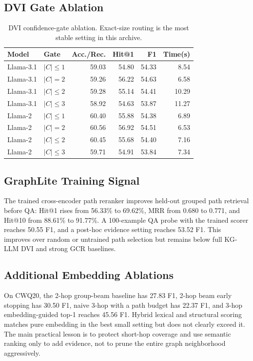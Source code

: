 \documentclass[10pt,twocolumn]{article}
\begin{document}
\subsection{DVI Gate Ablation}
\begin{table}[H]
\centering
\small
\begin{tabular}{llrrrr}
\toprule
Model & Gate & Acc./Rec. & Hit@1 & F1 & Time(s) \\
\midrule
Llama-3.1 & $|C|\le1$ & 59.03 & 54.80 & 54.33 & 8.54 \\
Llama-3.1 & $|C|=2$ & 59.26 & 56.22 & 54.63 & 6.58 \\
Llama-3.1 & $|C|\le2$ & 59.28 & 55.14 & 54.41 & 10.29 \\
Llama-3.1 & $|C|\le3$ & 58.92 & 54.63 & 53.87 & 11.27 \\
\midrule
Llama-2 & $|C|\le1$ & 60.40 & 55.88 & 54.38 & 6.89 \\
Llama-2 & $|C|=2$ & 60.56 & 56.92 & 54.51 & 6.53 \\
Llama-2 & $|C|\le2$ & 60.45 & 55.68 & 54.40 & 7.16 \\
Llama-2 & $|C|\le3$ & 59.71 & 54.91 & 53.84 & 7.34 \\
\bottomrule
\end{tabular}
\caption{DVI confidence-gate ablation. Exact-size routing is the most stable setting in this archive.}
\end{table}

\subsection{GraphLite Training Signal}
The trained cross-encoder path reranker improves held-out grouped path retrieval before QA: Hit@1 rises from 56.33\% to 69.62\%, MRR from 0.680 to 0.771, and Hit@10 from 88.61\% to 91.77\%. A 100-example QA probe with the trained scorer reaches 50.55 F1, and a post-hoc evidence setting reaches 53.52 F1. This improves over random or untrained path selection but remains below full KG-LLM DVI and strong GCR baselines.

\subsection{Additional Embedding Ablations}
On CWQ20, the 2-hop group-beam baseline has 27.83 F1, 2-hop beam early stopping has 30.50 F1, naive 3-hop with a path budget has 22.37 F1, and 3-hop embedding-guided top-1 reaches 45.56 F1. Hybrid lexical and structural scoring matches pure embedding in the best small setting but does not clearly exceed it. The main practical lesson is to protect short-hop coverage and use semantic ranking only to add evidence, not to prune the entire graph neighborhood aggressively.
\end{document}
